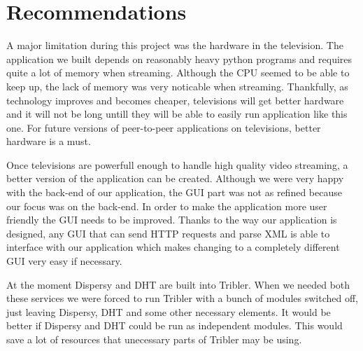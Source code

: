 \chapter{Recommendations}
\label{sec:recommendations}

A major limitation during this project was the hardware in the television. The application we built depends on reasonably heavy python programs and requires quite a lot of memory when streaming. Although the CPU seemed to be able to keep up, the lack of memory was very noticable when streaming. Thankfully, as technology improves and becomes cheaper, televisions will get better hardware and it will not be long untill they will be able to easily run application like this one. For future versions of peer-to-peer applications on televisions, better hardware is a must.

Once televisions are powerfull enough to handle high quality video streaming, a better version of the application can be created. Although we were very happy with the back-end of our application, the GUI part was not as refined because our focus was on the back-end. In order to make the application more user friendly the GUI needs to be improved. Thanks to the way our application is designed, any GUI that can send HTTP requests and parse XML is able to interface with our application which makes changing to a completely different GUI very easy if necessary.

At the moment Dispersy and DHT are built into Tribler. When we needed both these services we were forced to run Tribler with a bunch of modules switched off, just leaving Dispersy, DHT and some other necessary elements. It would be better if Dispersy and DHT could be run as independent modules. This would save a lot of resources that unecessary parts of Tribler may be using.
